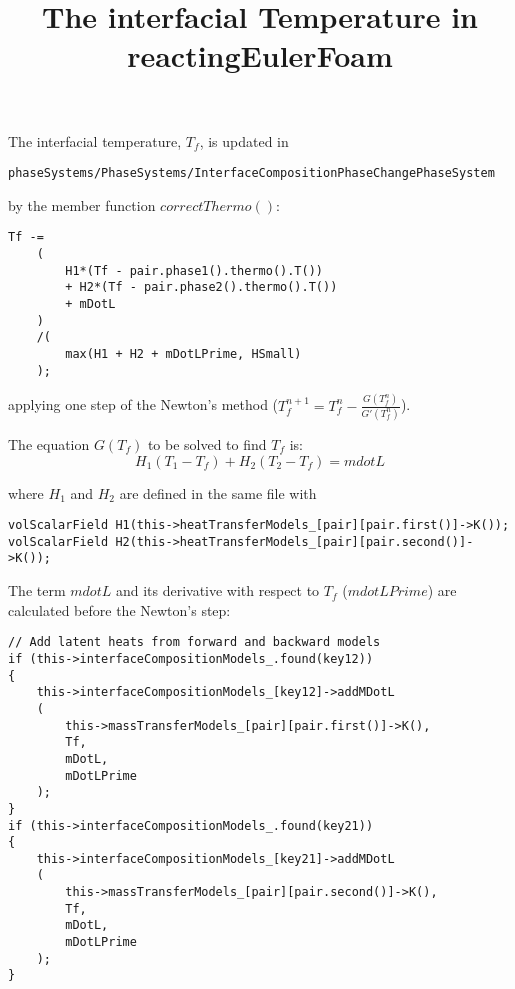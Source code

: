 \documentclass[]{report}
\title{The interfacial Temperature in reactingEulerFoam}
\author{}
\begin{document}
\maketitle

The interfacial temperature, $T_f$, is updated in
\begin{verbatim}
phaseSystems/PhaseSystems/InterfaceCompositionPhaseChangePhaseSystem
\end{verbatim}
by the member function $correctThermo()$:
\begin{verbatim}
Tf -=
	(
        H1*(Tf - pair.phase1().thermo().T())
        + H2*(Tf - pair.phase2().thermo().T())
        + mDotL
    )
    /(
        max(H1 + H2 + mDotLPrime, HSmall)
    );
\end{verbatim}
applying one step of the Newton's method ($T_f^{n+1}=T_f^{n}-\frac{G(T_f^{n})}{G'(T_f^{n})}$).

The equation $G(T_f)$ to be solved to find $T_f$ is:
\begin{equation}\label{EQ:Tf}
H_1(T_1-T_f)+H_2(T_2-T_f)= mdotL
\end{equation}

where $H_1$ and $H_2$ are defined in the same file with
\begin{verbatim}
volScalarField H1(this->heatTransferModels_[pair][pair.first()]->K());
volScalarField H2(this->heatTransferModels_[pair][pair.second()]->K());
\end{verbatim}

The term $mdotL$ and its derivative with respect to $T_f$ ($mdotLPrime$) are calculated before the Newton's step:
\begin{verbatim}
// Add latent heats from forward and backward models
if (this->interfaceCompositionModels_.found(key12))
{
    this->interfaceCompositionModels_[key12]->addMDotL
    (
        this->massTransferModels_[pair][pair.first()]->K(),
        Tf,
        mDotL,
        mDotLPrime
    );
}
if (this->interfaceCompositionModels_.found(key21))
{
    this->interfaceCompositionModels_[key21]->addMDotL
    (
        this->massTransferModels_[pair][pair.second()]->K(),
        Tf,
        mDotL, 
        mDotLPrime
    );
}
\end{verbatim}
\end{document}
